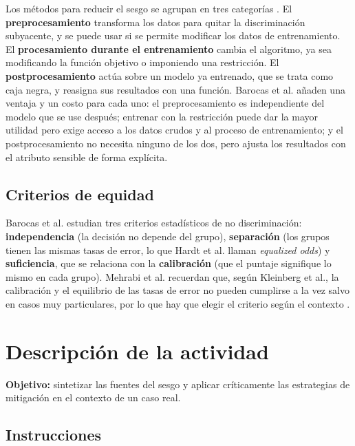 \documentclass[11pt,letterpaper]{article}
\begin{document}
Los métodos para reducir el sesgo se agrupan en tres categorías \parencite{mehrabi2021,barocas2023}. El \textbf{preprocesamiento} transforma los datos para quitar la discriminación subyacente, y se puede usar si se permite modificar los datos de entrenamiento. El \textbf{procesamiento durante el entrenamiento} cambia el algoritmo, ya sea modificando la función objetivo o imponiendo una restricción. El \textbf{postprocesamiento} actúa sobre un modelo ya entrenado, que se trata como caja negra, y reasigna sus resultados con una función. Barocas et al. añaden una ventaja y un costo para cada uno: el preprocesamiento es independiente del modelo que se use después; entrenar con la restricción puede dar la mayor utilidad pero exige acceso a los datos crudos y al proceso de entrenamiento; y el postprocesamiento no necesita ninguno de los dos, pero ajusta los resultados con el atributo sensible de forma explícita.

\subsection{Criterios de equidad}

Barocas et al. \parencite{barocas2023} estudian tres criterios estadísticos de no discriminación: \textbf{independencia} (la decisión no depende del grupo), \textbf{separación} (los grupos tienen las mismas tasas de error, lo que Hardt et al. llaman \textit{equalized odds}) y \textbf{suficiencia}, que se relaciona con la \textbf{calibración} (que el puntaje signifique lo mismo en cada grupo). Mehrabi et al. recuerdan que, según Kleinberg et al., la calibración y el equilibrio de las tasas de error no pueden cumplirse a la vez salvo en casos muy particulares, por lo que hay que elegir el criterio según el contexto \parencite{mehrabi2021}.

\section{Descripción de la actividad}

\textbf{Objetivo:} sintetizar las fuentes del sesgo y aplicar críticamente las estrategias de mitigación en el contexto de un caso real.

\subsection*{Instrucciones}
\end{document}
